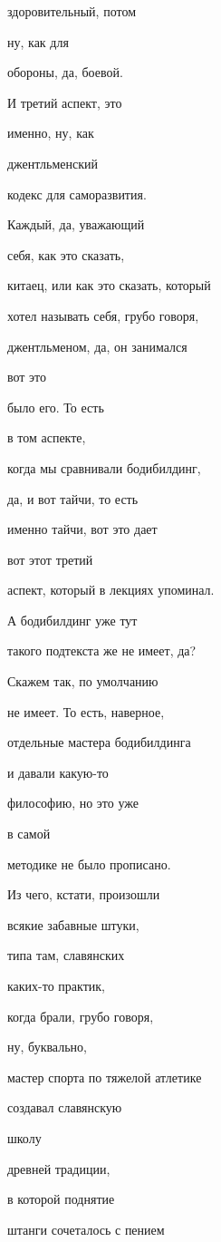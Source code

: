 здоровительный, потом

ну, как для

обороны, да, боевой.

И третий аспект, это

именно, ну, как

джентльменский

кодекс для саморазвития.

Каждый, да, уважающий

себя, как это сказать,

китаец, или как это сказать, который

хотел называть себя, грубо говоря,

джентльменом, да, он занимался

вот это

было его. То есть

в том аспекте,

когда мы сравнивали бодибилдинг,

да, и вот тайчи, то есть

именно тайчи, вот это дает

вот этот третий

аспект, который в лекциях упоминал.

А бодибилдинг уже тут

такого подтекста же не имеет, да?

Скажем так, по умолчанию

не имеет. То есть, наверное,

отдельные мастера бодибилдинга

и давали какую-то

философию, но это уже

в самой

методике не было прописано.

Из чего, кстати, произошли

всякие забавные штуки,

типа там, славянских

каких-то практик,

когда брали, грубо говоря,

ну, буквально,

мастер спорта по тяжелой атлетике

создавал славянскую

школу

древней традиции,

в которой поднятие

штанги сочеталось с пением

